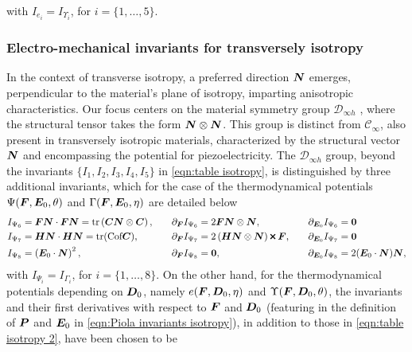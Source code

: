 %
with $I_{e_i}=I_{\Upsilon_i}$, for $i=\{1,\dots,5\}$.



\subsubsection{Electro-mechanical invariants for transversely isotropy}

In the context of transverse isotropy, a preferred direction $\boldsymbol{N}$ emerges, perpendicular to the material's plane of isotropy, imparting anisotropic characteristics. Our focus centers on the material symmetry group $\mathcal{D}_{\infty h}$ \cite{HORAK_electro}, where the structural tensor takes the form $\boldsymbol{N}\otimes\boldsymbol{N}$. This group is distinct from $\mathcal{C}_{\infty}$, also present in transversely isotropic materials, characterized by the structural vector $\boldsymbol{N}$ and encompassing the potential for piezoelectricity. The $\mathcal{D}_{\infty h}$ group, beyond the invariants $\{I_1,I_2,I_3,I_4,I_5\}$ in \eqref{eqn:table isotropy}, is distinguished by three additional invariants, which for the case of the thermodynamical potentials $\Psi(\boldsymbol{F},\boldsymbol{E}_0,\theta)$ and $\Gamma(\boldsymbol{F},\boldsymbol{E}_0,\eta)$ are detailed below
%
\begin{equation}\label{eqn:TI}
\begin{aligned}	
%
&I_{\Psi_6}=\vect{F}\vect{N}\cdot\vect{F}\vect{N}=\text{tr}\left(\vect{C}\vect{N}\otimes\vect{C}\right),&\quad &\partial_{\vect{F}}I_{\Psi_6}=2\vect{F}\vect{N}\otimes\vect{N},&\quad &\partial_{\vect{E}_0}I_{\Psi_6}=\vect{0}\\
%
%
&I_{\Psi_7}=\vect{H}\vect{N}\cdot\vect{H}\vect{N}=\text{tr}(\text{Cof}\vect{C})
%
%
,&\quad   
&\partial_{\vect{F}}I_{\Psi_7}=2\left(\vect{H}\vect{N}\otimes\vect{N}\right)\Cross \vect{F},&\quad &\partial_{\vect{E}_0}I_{\Psi_7}=\vect{0}\\
%
%
&I_{\Psi_8}=\left(\vect{E}_0\cdot\vect{N}\right)^2
%
%
,&\quad   
&\partial_{\vect{F}}I_{\Psi_8}=\vect{0},&\quad &\partial_{\vect{E}_0}I_{\Psi_8}=2(\vect{E}_0\cdot \vect{N})\vect{N},
%
\end{aligned}
\end{equation}
%
with $I_{\Psi_i}=I_{\Gamma_i}$, for $i=\{1,\dots,8\}$. On the other hand, for the thermodynamical potentials depending on $\boldsymbol{D}_0$, namely $e(\boldsymbol{F},\boldsymbol{D}_0,\eta)$ and $\Upsilon(\boldsymbol{F},\boldsymbol{D}_0,\theta)$, the invariants and their first derivatives with respect to $\boldsymbol{F}$ and $\boldsymbol{D}_0$ (featuring in the definition of $\boldsymbol{P}$ and $\boldsymbol{E}_0$ in \eqref{eqn:Piola invariants isotropy}), in addition to those in \eqref{eqn:table isotropy 2}, have been chosen to be

